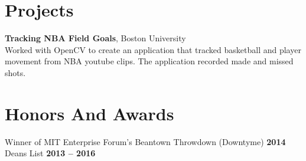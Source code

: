 \documentclass[margin,line]{resume}
\begin{document}
\begin{resume}
   \section{\mysidestyle Projects}
   \textbf{Tracking NBA Field Goals}, Boston University \vspace{2mm}\\\vspace{1mm}%
\vspace{-2mm}Worked with OpenCV to create an application that tracked basketball and player movement from NBA youtube clips. The application recorded made and missed shots.
    \section{\mysidestyle Honors And Awards}
    Winner of MIT Enterprise Forum’s Beantown Throwdown (Downtyme) \hfill \textbf{2014}\\
        Deans List \hfill \textbf{2013 -- 2016}\\

    

\end{resume}
\end{document}
